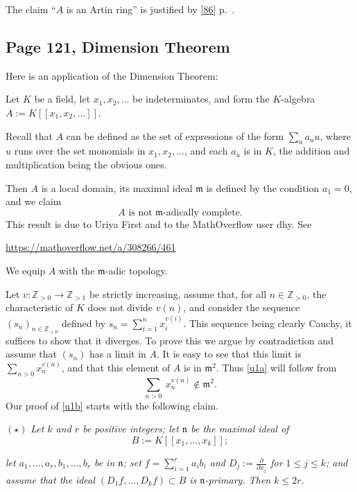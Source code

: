 \documentclass[parskip=half,fontsize=12pt]{scrartcl}%
\newcommand{\mf}{\mathfrak}
\newcommand{\mmm}{\mf m}
\begin{document}
The claim ``$A$ is an Artin ring'' is justified by \eqref{86} p.~\pageref{86}.

\subsection{Page 121, Dimension Theorem}\label{dt}%

Here is an application of the Dimension Theorem: 

Let $K$ be a field, let $x_1,x_2,\dots$ be indeterminates, and form the $K$-algebra  $A:=K[[x_1,x_2,\dots]]$. 

Recall that $A$ can be defined as the set of expressions of the form $\sum_ua_uu$, where $u$ runs over the set monomials in $x_1,x_2,\dots$, and each $a_u$ is in $K$, the addition and multiplication being the obvious ones. 

Then $A$ is a local domain, its maximal ideal $\mathfrak m$ is defined by the condition $a_1=0$, and we claim 
\begin{equation}\label{u1a}
\boxed{A\text{ is not }\mathfrak m\text{-adically complete.}}
\end{equation}
This result is due to Uriya First and to the MathOverflow user dhy. See \\ %

\centerline{\href{https://mathoverflow.net/a/308266/461}{https://mathoverflow.net/a/308266/461}}

We equip $A$ with the $\mmm$-adic topology.

Let $v:\mathbb Z_{>0}\to\mathbb Z_{>1}$ be strictly increasing, assume that, for all $n\in\mathbb Z_{>0}$, the characteristic of $K$ does not divide $v(n)$, and consider the sequence $(s_n)_{n\in\mathbb Z_{>0}}$ defined by $s_n=\sum_{i=1}^nx_i^{v(i)}$. This sequence being clearly Cauchy, it suffices to show that it diverges. To prove this we argue by contradiction and assume that $(s_n)$ has a limit in $A$. It is easy to see that this limit is $\sum_{n>0}x_n^{v(n)}$, and that this element of $A$ is in $\mmm^2$. Thus \eqref{u1a} will follow from 
\begin{equation}\label{u1b}
\sum_{n>0}\ x_n^{v(n)}\notin\mmm^2.
\end{equation} 
Our proof of \eqref{u1b} starts with the following claim.

$(\star)$ {\em Let $k$ and $r$ be positive integers; let $\mathfrak n$ be the maximal ideal of} 
$$
B:=K[[x_1,\dots,x_k]];
$$ 

{\em let $a_1,\dots,a_r,b_1,\dots,b_r$ be in $\mathfrak n$; set $f=\sum_{i=1}^ra_ib_i$ and $D_j:=\frac{\partial}{\partial x_j}$ for $1\le j\le k$; and assume that the ideal $(D_1f,\dots,D_kf)\subset B$ is $\mathfrak n$-primary. Then $k\le2r$.}
\end{document}
